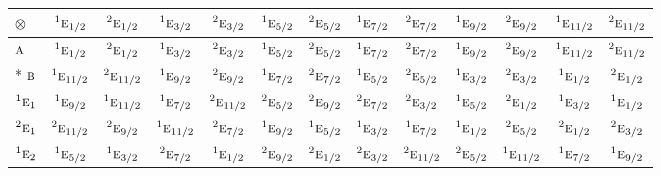 \documentclass[10pt,a4paper]{article}
\numberwithin{equation}{section}
\newcommand{\irr}[1]{\text{\normalfont\scshape #1}}
\newcommand{\conjpair}[1]{{}^{#1}}
\newcommand{\irrprod}{\otimes}
\begin{document}
{\small\setlength{\tabcolsep}{3pt}\begin{longtable}{@{}lcccccccccccc@{}}\toprule
$\irrprod$ & $\conjpair{1}\irr{e}_{1/2}$ & $\conjpair{2}\irr{e}_{1/2}$ & $\conjpair{1}\irr{e}_{3/2}$ & $\conjpair{2}\irr{e}_{3/2}$ & $\conjpair{1}\irr{e}_{5/2}$ & $\conjpair{2}\irr{e}_{5/2}$ & $\conjpair{1}\irr{e}_{7/2}$ & $\conjpair{2}\irr{e}_{7/2}$ & $\conjpair{1}\irr{e}_{9/2}$ & $\conjpair{2}\irr{e}_{9/2}$ & $\conjpair{1}\irr{e}_{11/2}$ & $\conjpair{2}\irr{e}_{11/2}$\\\midrule\endhead
\bottomrule\endfoot\endlastfoot
$\irr{a}$ & $\conjpair{1}\irr{e}_{1/2}$ & $\conjpair{2}\irr{e}_{1/2}$ & $\conjpair{1}\irr{e}_{3/2}$ & $\conjpair{2}\irr{e}_{3/2}$ & $\conjpair{1}\irr{e}_{5/2}$ & $\conjpair{2}\irr{e}_{5/2}$ & $\conjpair{1}\irr{e}_{7/2}$ & $\conjpair{2}\irr{e}_{7/2}$ & $\conjpair{1}\irr{e}_{9/2}$ & $\conjpair{2}\irr{e}_{9/2}$ & $\conjpair{1}\irr{e}_{11/2}$ & $\conjpair{2}\irr{e}_{11/2}$\\*
$\irr{b}$ & $\conjpair{1}\irr{e}_{11/2}$ & $\conjpair{2}\irr{e}_{11/2}$ & $\conjpair{1}\irr{e}_{9/2}$ & $\conjpair{2}\irr{e}_{9/2}$ & $\conjpair{1}\irr{e}_{7/2}$ & $\conjpair{2}\irr{e}_{7/2}$ & $\conjpair{1}\irr{e}_{5/2}$ & $\conjpair{2}\irr{e}_{5/2}$ & $\conjpair{1}\irr{e}_{3/2}$ & $\conjpair{2}\irr{e}_{3/2}$ & $\conjpair{1}\irr{e}_{1/2}$ & $\conjpair{2}\irr{e}_{1/2}$\\
$\conjpair{1}\irr{e}_{1}$ & $\conjpair{1}\irr{e}_{9/2}$ & $\conjpair{1}\irr{e}_{11/2}$ & $\conjpair{1}\irr{e}_{7/2}$ & $\conjpair{2}\irr{e}_{11/2}$ & $\conjpair{2}\irr{e}_{5/2}$ & $\conjpair{2}\irr{e}_{9/2}$ & $\conjpair{2}\irr{e}_{7/2}$ & $\conjpair{2}\irr{e}_{3/2}$ & $\conjpair{1}\irr{e}_{5/2}$ & $\conjpair{2}\irr{e}_{1/2}$ & $\conjpair{1}\irr{e}_{3/2}$ & $\conjpair{1}\irr{e}_{1/2}$\\
$\conjpair{2}\irr{e}_{1}$ & $\conjpair{2}\irr{e}_{11/2}$ & $\conjpair{2}\irr{e}_{9/2}$ & $\conjpair{1}\irr{e}_{11/2}$ & $\conjpair{2}\irr{e}_{7/2}$ & $\conjpair{1}\irr{e}_{9/2}$ & $\conjpair{1}\irr{e}_{5/2}$ & $\conjpair{1}\irr{e}_{3/2}$ & $\conjpair{1}\irr{e}_{7/2}$ & $\conjpair{1}\irr{e}_{1/2}$ & $\conjpair{2}\irr{e}_{5/2}$ & $\conjpair{2}\irr{e}_{1/2}$ & $\conjpair{2}\irr{e}_{3/2}$\\
$\conjpair{1}\irr{e}_{2}$ & $\conjpair{1}\irr{e}_{5/2}$ & $\conjpair{1}\irr{e}_{3/2}$ & $\conjpair{2}\irr{e}_{7/2}$ & $\conjpair{1}\irr{e}_{1/2}$ & $\conjpair{2}\irr{e}_{9/2}$ & $\conjpair{2}\irr{e}_{1/2}$ & $\conjpair{2}\irr{e}_{3/2}$ & $\conjpair{2}\irr{e}_{11/2}$ & $\conjpair{2}\irr{e}_{5/2}$ & $\conjpair{1}\irr{e}_{11/2}$ & $\conjpair{1}\irr{e}_{7/2}$ & $\conjpair{1}\irr{e}_{9/2}$\\

\end{longtable}}
\end{document}
